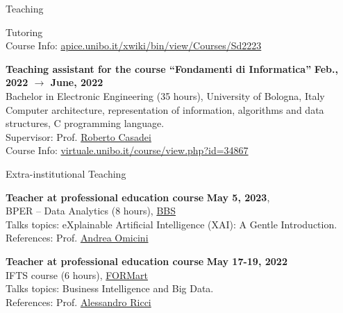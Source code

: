 \documentclass{resume} %
\begin{document}
\begin{rSection}{Teaching}
\begin{rSubsection2}{Tutoring}
            \\Course Info: \url{apice.unibo.it/xwiki/bin/view/Courses/Sd2223}
            \item\textbf{ Teaching assistant for the course ``Fondamenti di Informatica'' }\hfill \textbf{Feb., 2022 $\rightarrow$ June, 2022}
            \\Bachelor in Electronic Engineering (35 hours), University of Bologna, Italy
            \\Computer architecture, representation of information, algorithms and data structures, C programming language.
            \\Supervisor: Prof. \href{mailto:roberto.casadei@unibo.it}{Roberto Casadei}
            \\Course Info: \url{virtuale.unibo.it/course/view.php?id=34867}
        \end{rSubsection2}


        \begin{rSubsection2}{Extra-institutional Teaching}
            \item\textbf{ Teacher at professional education course }\hfill \textbf{May 5, 2023},
            \\BPER -- Data Analytics (8 hours), \href{https://www.bbs.unibo.eu/}{BBS}
            \\Talks topics: eXplainable Artificial Intelligence (XAI): A Gentle Introduction.
            \\References:  Prof. \href{mailto:andrea.omicini@unibo.it}{Andrea Omicini}
            \item\textbf{ Teacher at professional education course }\hfill \textbf{May 17-19, 2022}
            \\IFTS course (6 hours), \href{http://www.formart.it/home}{FORMart}
            \\Talks topics: Business Intelligence and Big Data.
            \\References:  Prof. \href{mailto:a.ricci@unibo.it}{Alessandro Ricci}
        \end{rSubsection2}



\end{rSection}
\end{document}
